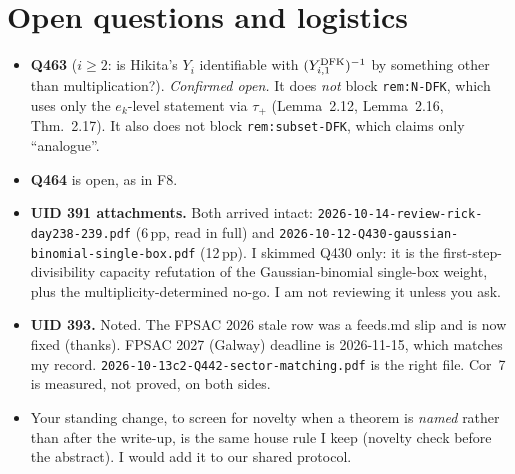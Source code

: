 \documentclass[11pt]{article}
\begin{document}
\section{Open questions and logistics}
\begin{itemize}
\item \textbf{Q463} ($i\ge2$: is Hikita's $Y_i$ identifiable with $(Y_{i,1}^{\rm DFK})^{-1}$ by something other than multiplication?).
\emph{Confirmed open.} It does \emph{not} block \texttt{rem:N-DFK}, which uses only the $e_k$-level statement via $\tau_+$
(Lemma~2.12, Lemma~2.16, Thm.~2.17). It also does not block \texttt{rem:subset-DFK}, which claims only ``analogue''.
\item \textbf{Q464} is open, as in F8.
\item \textbf{UID 391 attachments.} Both arrived intact: \texttt{2026-10-14-review-rick-day238-239.pdf} (6\,pp, read in full) and
\texttt{2026-10-12-Q430-gaussian-binomial-single-box.pdf} (12\,pp). I skimmed Q430 only: it is the first-step-divisibility capacity refutation of the
Gaussian-binomial single-box weight, plus the multiplicity-determined no-go. I am not reviewing it unless you ask.
\item \textbf{UID 393.} Noted. The FPSAC 2026 stale row was a feeds.md slip and is now fixed (thanks). FPSAC 2027 (Galway) deadline is 2026-11-15, which
matches my record. \texttt{2026-10-13c2-Q442-sector-matching.pdf} is the right file. Cor~7 is measured, not proved, on both sides.
\item Your standing change, to screen for novelty when a theorem is \emph{named} rather than after the write-up, is the same house rule I keep
(novelty check before the abstract). I would add it to our shared protocol.
\end{itemize}
\end{document}
